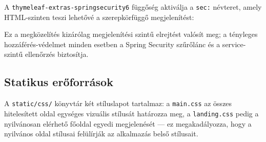 A \texttt{thymeleaf-extras-springsecurity6} függőség aktiválja a \texttt{sec:} névteret, amely HTML-szinten teszi lehetővé a szerepkörfüggő megjelenítést:


Ez a megközelítés kizárólag megjelenítési szintű elrejtést valósít meg; a tényleges hozzáférés-védelmet minden esetben a Spring Security szűrőlánc és a service-szintű ellenőrzés biztosítja.

\subsection{Statikus erőforrások}

A \texttt{static/css/} könyvtár két stíluslapot tartalmaz: a \texttt{main.css} az összes hitelesített oldal egységes vizuális stílusát határozza meg, a \texttt{landing.css} pedig a nyilvánosan elérhető főoldal egyedi megjelenését — ez megakadályozza, hogy a nyilvános oldal stílusai felülírják az alkalmazás belső stílusait.
